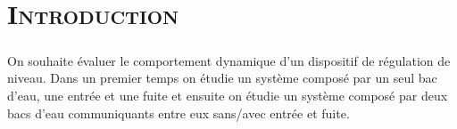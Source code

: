 \chapter*{\textsc{Introduction}}

	\paragraph{} On souhaite évaluer le comportement dynamique d’un dispositif de régulation de niveau. Dans un premier temps on étudie un système composé par un seul bac d’eau, une entrée et une fuite et ensuite on étudie un
système composé par deux bacs d’eau communiquants entre eux sans/avec entrée et fuite.